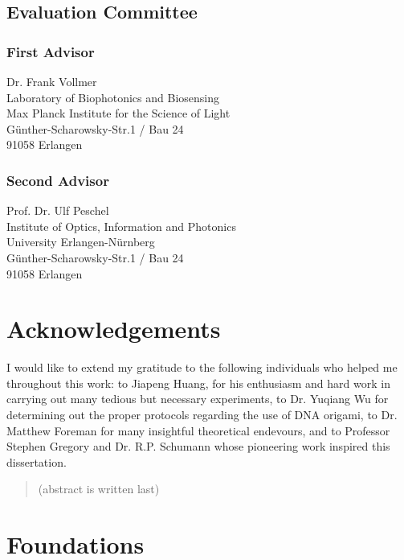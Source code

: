 \documentclass[a4paper,titlepage,onecolumn]{report}
\begin{document}
\section*{Evaluation Committee}
\subsection*{First Advisor}
Dr. Frank Vollmer\\
Laboratory of Biophotonics and Biosensing\\
Max Planck Institute for the Science of Light\\
G\"unther-Scharowsky-Str.1 / Bau 24\\
91058 Erlangen
\subsection*{Second Advisor}
Prof. Dr. Ulf Peschel\\
Institute of Optics, Information and Photonics\\
University Erlangen-N\"urnberg\\
G\"unther-Scharowsky-Str.1 / Bau 24\\
91058 Erlangen

\newpage
\chapter*{Acknowledgements}
I would like to extend my gratitude to the following individuals who helped
me throughout this work: to Jiapeng Huang, for his enthusiasm and hard work
in carrying out many tedious but necessary experiments, to Dr. Yuqiang Wu
for determining out the proper protocols regarding the use of DNA origami,
to Dr. Matthew Foreman for many insightful theoretical endevours, and to
Professor Stephen Gregory and Dr. R.P. Schumann whose pioneering work
inspired this dissertation.

\tableofcontents

\begin{abstract}
(abstract is written last)
\end{abstract}

\chapter{Foundations}
\end{document}
